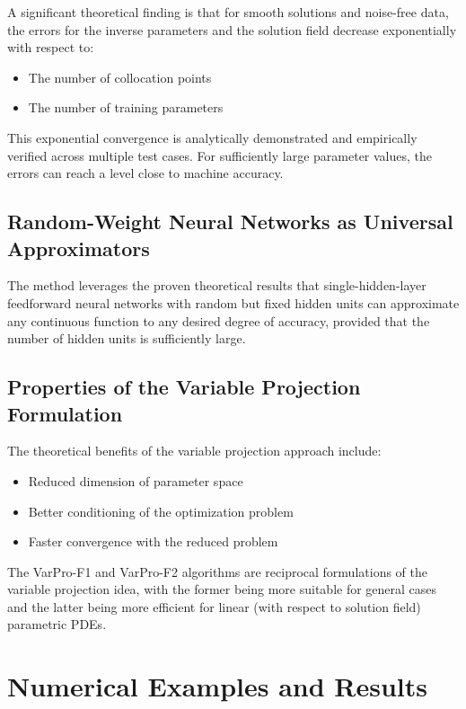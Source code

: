 \documentclass[11pt,a4paper]{article}
\begin{document}
A significant theoretical finding is that for smooth solutions and noise-free data, the errors for the inverse parameters and the solution field decrease exponentially with respect to:
\begin{itemize}
    \item The number of collocation points
    \item The number of training parameters
\end{itemize}

This exponential convergence is analytically demonstrated and empirically verified across multiple test cases. For sufficiently large parameter values, the errors can reach a level close to machine accuracy.

\subsection{Random-Weight Neural Networks as Universal Approximators}

The method leverages the proven theoretical results that single-hidden-layer feedforward neural networks with random but fixed hidden units can approximate any continuous function to any desired degree of accuracy, provided that the number of hidden units is sufficiently large.

\subsection{Properties of the Variable Projection Formulation}

The theoretical benefits of the variable projection approach include:
\begin{itemize}
    \item Reduced dimension of parameter space
    \item Better conditioning of the optimization problem
    \item Faster convergence with the reduced problem
\end{itemize}

The VarPro-F1 and VarPro-F2 algorithms are reciprocal formulations of the variable projection idea, with the former being more suitable for general cases and the latter being more efficient for linear (with respect to solution field) parametric PDEs.

\section{Numerical Examples and Results}
\end{document}
